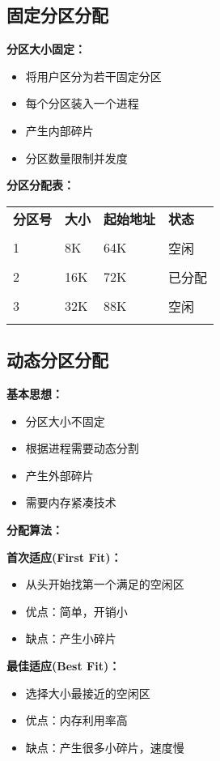 \documentclass[lang=cn,newtx,10pt,scheme=chinese]{../../elegantbook}
\begin{document}
\subsection{固定分区分配}

\textbf{分区大小固定：}
\begin{itemize}
  \item 将用户区分为若干固定分区
  \item 每个分区装入一个进程
  \item 产生内部碎片
  \item 分区数量限制并发度
\end{itemize}

\textbf{分区分配表：}
\begin{longtable}{@{}p{3cm}p{3cm}p{3cm}p{3cm}@{}}
\toprule
\textbf{分区号} & \textbf{大小} & \textbf{起始地址} & \textbf{状态} \\\\ \midrule
\endhead

1 & 8K & 64K & 空闲 \\\\
2 & 16K & 72K & 已分配 \\\\
3 & 32K & 88K & 空闲 \\\\

\bottomrule
\end{longtable}

\subsection{动态分区分配}

\textbf{基本思想：}
\begin{itemize}
  \item 分区大小不固定
  \item 根据进程需要动态分割
  \item 产生外部碎片
  \item 需要内存紧凑技术
\end{itemize}

\textbf{分配算法：}

\textbf{首次适应(First Fit)：}
\begin{itemize}
  \item 从头开始找第一个满足的空闲区
  \item 优点：简单，开销小
  \item 缺点：产生小碎片
\end{itemize}

\textbf{最佳适应(Best Fit)：}
\begin{itemize}
  \item 选择大小最接近的空闲区
  \item 优点：内存利用率高
  \item 缺点：产生很多小碎片，速度慢
\end{itemize}
\end{document}
